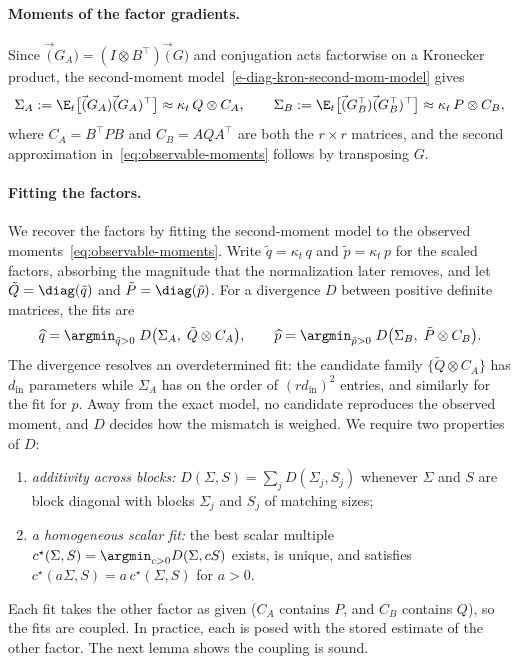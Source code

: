 \paragraph{Moments of the factor gradients.} Since
$\vec(G_A)=(I\otimes B^\top)\vec(G)$ and conjugation acts factorwise on
a Kronecker product, the second-moment
model~\eqref{e-diag-kron-second-mom-model} gives
\begin{equation}\label{eq:observable-moments}
  \Sigma_A:=\E_t\big[\vec(G_A)\vec(G_A)^\top\big] \approx\kappa_t\,Q\otimes C_A,
  \qquad
  \Sigma_B:=\E_t\big[\vec(G_B^\top)\vec(G_B^\top)^\top\big] \approx \kappa_t\,P\otimes C_B,
\end{equation}
where $C_A=B^\top PB$ and $C_B=AQA^\top$ are both the $r\times r$ matrices, and the second approximation in~\eqref{eq:observable-moments} follows by
transposing $G$.

\paragraph{Fitting the factors.} We recover the factors by fitting the
second-moment model to the observed moments~\eqref{eq:observable-moments}. Write $\tilde q=\kappa_t\,q$ and
$\tilde p=\kappa_t\,p$ for the scaled factors, 
absorbing the
magnitude that the normalization later removes, and let
$\tilde Q=\diag(\tilde q)$ and $\tilde P=\diag(\tilde p)$.
For a divergence $D$ between positive definite matrices, the fits are
\begin{equation}\label{eq:factor-fit}
  \widehat q
  =\argmin_{\tilde q>0}\;
  D\big(\Sigma_A,\;\tilde Q\otimes C_A\big),
  \qquad
  \widehat p
  =\argmin_{\tilde p>0}\;
  D\big(\Sigma_B,\;\tilde P\otimes C_B\big).
\end{equation}
The divergence resolves an overdetermined fit: the candidate family
$\{\tilde Q\otimes C_A\}$ has $d_{\mathrm{in}}$ parameters while
$\Sigma_A$ has on the order of $(rd_{\mathrm{in}})^2$ entries, and
similarly for the fit for $p$. Away from the exact model, no candidate
reproduces the observed moment, and $D$ decides how the mismatch is
weighed. We require two properties of $D$:
\begin{enumerate}[label=(\roman*),ref=(\roman*),leftmargin=2.2em,itemsep=1pt,topsep=2pt]
  \item\label{it:block-additive} \emph{additivity across blocks:}
  $D(\Sigma,S)=\sum_jD(\Sigma_j,S_j)$ whenever $\Sigma$ and $S$ are
  block diagonal with blocks $\Sigma_j$ and $S_j$ of matching sizes;
  \item\label{it:scalar-fit} \emph{a homogeneous scalar fit:} the best scalar multiple
  $c^\star(\Sigma,S)=\argmin_{c>0}D(\Sigma,cS)$ exists, is unique, and
  satisfies $c^\star(a\Sigma,S)=a\,c^\star(\Sigma,S)$ for $a>0$.
\end{enumerate}
Each fit takes the other factor as given ($C_A$ contains $P$, and
$C_B$ contains $Q$), so the fits are coupled. In practice, each is
posed with the stored estimate of the other factor. The next lemma
shows the coupling is sound.

